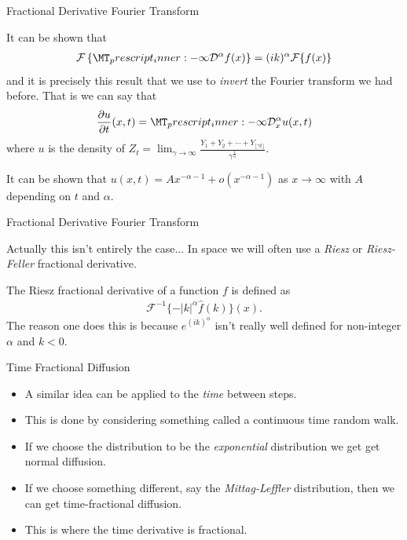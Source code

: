 \documentclass[pdf]{beamer}
\newcommand{\lra}{\longrightarrow}
\begin{document}
\begin{frame}{Fractional Derivative Fourier Transform}

	It can be shown that
	\begin{align}
	    \mathcal{F}\left\{\prescript{}{-\infty}{\mathcal{D}^\alpha}f(x) \right\} = (ik)^\alpha \mathcal{F}\{ f(x) \}
    \end{align}
    and it is precisely this result that we use to \emph{invert} the Fourier transform we had before.
    That is we can say that
    \begin{align}
        \frac{\partial u}{\partial t}(x,t) = \prescript{}{-\infty}{\mathcal{D}^\alpha_x} u(x,t)
    \end{align}
    where $u $ is the density of $ Z_t = \lim_{\gamma\lra\infty} \frac{Y_1 + Y_2 + \cdots + Y_{\lfloor \gamma t \rfloor}}{\gamma^\frac{1}{\alpha}} $.
    
    It can be shown that $ u(x,t) = Ax^{-\alpha-1} + o(x^{-\alpha-1}) $ as $ x \lra \infty $ with $ A $ depending on $ t $ and $ \alpha $.
\end{frame}

\begin{frame}{Fractional Derivative Fourier Transform}

    Actually this isn't entirely the case...
    In space we will often use a \emph{Riesz} or \emph{Riesz-Feller} fractional derivative. 
    
    The Riesz fractional derivative of a function $ f $ is defined as 
    \begin{align}
        \mathcal{F}^{-1}\{-|k|^\alpha \hat{f}(k) \}(x).
    \end{align}
    The reason one does this is because $ e^{(ik)^\alpha} $ isn't really well defined for non-integer $ \alpha $ and $ k < 0 $. 
\end{frame}

\begin{frame}{Time Fractional Diffusion}
    \begin{itemize}
        \item A similar idea can be applied to the \emph{time} between steps. 
        \item This is done by considering something called a continuous time random walk.
        \item If we choose the distribution to be the \emph{exponential} distribution we get get normal diffusion.
        \item If we choose something different, say the \emph{Mittag-Leffler} distribution, then we can get time-fractional diffusion.
        \item This is where the time derivative is fractional.
    \end{itemize}
\end{frame}
	
\end{document}
